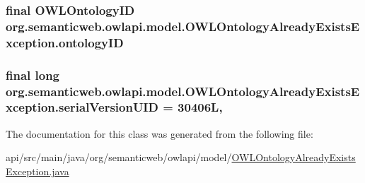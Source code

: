 \hypertarget{classorg_1_1semanticweb_1_1owlapi_1_1model_1_1_o_w_l_ontology_already_exists_exception_a459a09b8b7bd53ea758f93cffc08c76e}{
\subsubsection[{ontology\-I\-D}]{\setlength{\rightskip}{0pt plus 5cm}final {\bf O\-W\-L\-Ontology\-I\-D} org.\-semanticweb.\-owlapi.\-model.\-O\-W\-L\-Ontology\-Already\-Exists\-Exception.\-ontology\-I\-D\hspace{0.3cm}{\ttfamily [private]}}}\label{classorg_1_1semanticweb_1_1owlapi_1_1model_1_1_o_w_l_ontology_already_exists_exception_a459a09b8b7bd53ea758f93cffc08c76e}
\hypertarget{classorg_1_1semanticweb_1_1owlapi_1_1model_1_1_o_w_l_ontology_already_exists_exception_a57552fbb96993dae87aa5990ea8e0230}{
\subsubsection[{serial\-Version\-U\-I\-D}]{\setlength{\rightskip}{0pt plus 5cm}final long org.\-semanticweb.\-owlapi.\-model.\-O\-W\-L\-Ontology\-Already\-Exists\-Exception.\-serial\-Version\-U\-I\-D = 30406\-L\hspace{0.3cm}{\ttfamily [static]}, {\ttfamily [private]}}}\label{classorg_1_1semanticweb_1_1owlapi_1_1model_1_1_o_w_l_ontology_already_exists_exception_a57552fbb96993dae87aa5990ea8e0230}


The documentation for this class was generated from the following file\-:\begin{DoxyCompactItemize}
\item 
api/src/main/java/org/semanticweb/owlapi/model/\hyperlink{_o_w_l_ontology_already_exists_exception_8java}{O\-W\-L\-Ontology\-Already\-Exists\-Exception.\-java}\end{DoxyCompactItemize}

